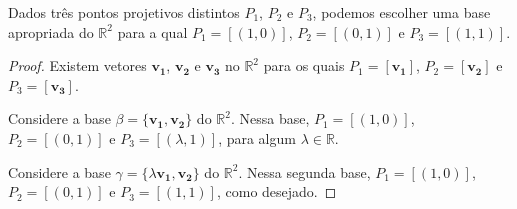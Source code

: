 \begin{thm}
  Dados três pontos projetivos distintos \(P_1\), \(P_2\) e \(P_3\), podemos escolher uma base apropriada do \(\mathbb{R}^2\) para a qual \(P_1 = [(1, 0)]\),  \(P_2 = [(0, 1)]\) e \(P_3 = [(1, 1)]\).
\end{thm}
\begin{proof}
  Existem vetores \(\mathbf{v_1}\), \(\mathbf{v_2}\) e \(\mathbf{v_3}\) no \(\mathbb{R}^2\) para os quais \(P_1 = [\mathbf{v_1}]\), \(P_2 = [\mathbf{v_2}]\) e \(P_3 = [\mathbf{v_3}]\).

  Considere a base \(\beta = \{\mathbf{v_1}, \mathbf{v_2}\}\) do \(\mathbb{R}^2\). Nessa base, \(P_1 = [(1, 0)]\),  \(P_2 = [(0, 1)]\) e \(P_3 = [(\lambda, 1)]\), para algum \(\lambda \in \mathbb{R}\).

  Considere a base \(\gamma = \{\lambda\mathbf{v_1}, \mathbf{v_2}\}\) do \(\mathbb{R}^2\). Nessa segunda base, \(P_1 = [(1, 0)]\),  \(P_2 = [(0, 1)]\) e \(P_3 = [(1, 1)]\), como desejado.
\end{proof}
